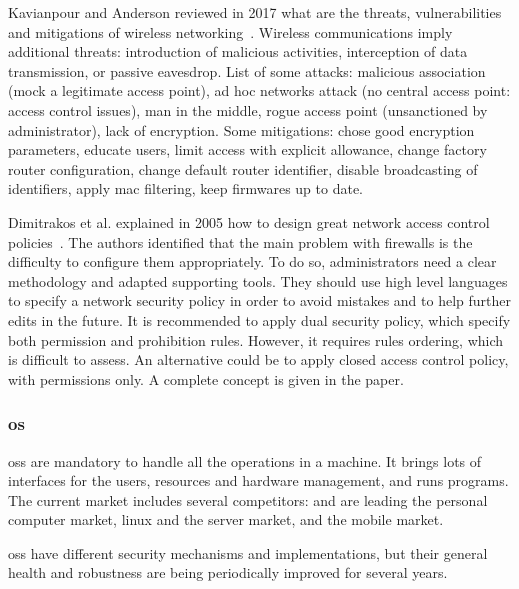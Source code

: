 Kavianpour and Anderson reviewed in 2017 what are the threats, vulnerabilities and mitigations of wireless networking~\cite{kavianpour_overview_2017}. Wireless communications imply additional threats: introduction of malicious activities, interception of data transmission, or passive eavesdrop. List of some attacks: malicious association (mock a legitimate access point), ad hoc networks attack (no central access point: access control issues), man in the middle, rogue access point (unsanctioned by administrator), lack of encryption. Some mitigations: chose good encryption parameters, educate users, limit access with explicit allowance, change factory router configuration, change default router identifier, disable broadcasting of identifiers, apply \gls{mac} filtering, keep firmwares up to date. %

Dimitrakos et al. explained in 2005 how to design great network access control policies~\cite{dimitrakos_formal_2005}. The authors identified that the main problem with firewalls is the difficulty to configure them appropriately. To do so, administrators need a clear methodology and adapted supporting tools. They should use high level languages to specify a network security policy in order to avoid mistakes and to help further edits in the future. It is recommended to apply dual security policy, which specify both permission and prohibition rules. However, it requires rules ordering, which is difficult to assess. An alternative could be to apply closed access control policy, with permissions only. A complete concept is given in the paper. %

\subsubsection{\acrlong*{os}}
\label{subsubsec:state_review_results_operatingsystems}

\Glspl{os} are mandatory to handle all the operations in a machine. It brings lots of interfaces for the users, resources and hardware management, and runs programs. The current market includes several competitors:  and  are leading the personal computer market, \gls{linux} and  the server market,  and  the mobile market.

\Glspl{os} have different security mechanisms and implementations, but their general health and robustness are being periodically improved for several years.

